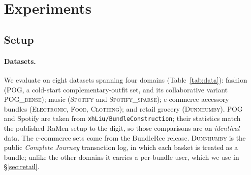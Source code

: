 \section{Experiments}
\label{sec:exp}

\subsection{Setup}
\label{sec:setup}
\paragraph{Datasets.} We evaluate on eight datasets spanning four domains (Table~\ref{tab:data}): fashion
(\textsc{POG}, a cold-start complementary-outfit set, and its collaborative variant \textsc{POG\_dense});
music (\textsc{Spotify} and \textsc{Spotify\_sparse}); e-commerce accessory bundles (\textsc{Electronic},
\textsc{Food}, \textsc{Clothing}); and retail grocery (\textsc{Dunnhumby}). POG and Spotify are taken from
\texttt{xhLiu/BundleConstruction}; their statistics match the published RaMen setup to the digit, so those
comparisons are on \emph{identical} data. The e-commerce sets come from the BundleRec release.
\textsc{Dunnhumby} is the public \emph{Complete Journey} transaction log, in which each basket is treated as a
bundle; unlike the other domains it carries a per-bundle user, which we use in \S\ref{sec:retail}.

